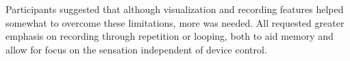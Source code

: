 Participants suggested that although %
visualization and recording features helped somewhat %
to overcome these limitations, more was needed. %
All  requested greater emphasis on recording through repetition or looping, both to aid memory and allow for focus on the sensation independent of device control. 

%



